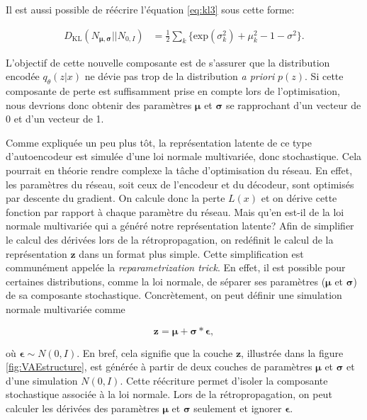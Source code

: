 Il est aussi possible de réécrire l'équation \ref{eq:kl3} sous cette forme:

\begin{equation}  \label{eq:kl4}
\begin{aligned}
D_{\text{KL}}(N_{\boldsymbol \mu, \boldsymbol \sigma} || N_{0,I}) &= \frac{1}{2} \sum_{k}\Big\{\text{exp}(\sigma_{k}^2) + \mu_{k}^2 - 1 - \sigma^2\Big\}.
\end{aligned}
\end{equation}


 L'objectif de cette nouvelle composante est de s'assurer que la distribution encodée $q_{\theta}(z|x)$ ne dévie pas trop de la distribution \textit{a priori} $p(z)$. Si cette composante de perte est suffisamment prise en compte lors de l'optimisation, nous devrions donc obtenir des paramètres $\boldsymbol{\mu}$ et $\boldsymbol{\sigma}$ se rapprochant d'un vecteur de 0 et d'un vecteur de 1.

Comme expliquée un peu plus tôt, la représentation latente de ce type d'autoencodeur est simulée d'une loi normale multivariée, donc stochastique. Cela pourrait en théorie rendre complexe la tâche d'optimisation du réseau. En effet, les paramètres du réseau, soit ceux de l'encodeur et du décodeur, sont optimisés par descente du gradient. On calcule donc la perte $L(x)$ et on dérive cette fonction par rapport à chaque paramètre du réseau. Mais qu'en est-il de la loi normale multivariée qui a généré notre représentation latente? Afin de simplifier le calcul des dérivées lors de la rétropropagation, on redéfinit le calcul de la représentation $\boldsymbol{z}$ dans un format plus simple. Cette simplification est communément appelée la  \textit{reparametrization trick}. En effet, il est possible pour certaines distributions, comme la loi normale, de séparer ses paramètres ($\boldsymbol{\mu}$ et $\boldsymbol{\sigma}$)  de sa composante stochastique. Concrètement, on peut définir une simulation normale multivariée comme

\begin{equation} \label{eq:latent_formula}
\boldsymbol{z} = \boldsymbol{\mu} + \boldsymbol{\sigma} *\boldsymbol{\epsilon},
\end{equation}

où $\boldsymbol{\epsilon} \sim N(0,I)$. En bref, cela signifie que la couche $\boldsymbol{z}$, illustrée dans la figure \ref{fig:VAEstructure}, est générée à partir de deux couches de paramètres $\boldsymbol{\mu}$ et $\boldsymbol{\sigma}$ et d'une simulation $N(0,I)$. Cette réécriture permet d'isoler la composante stochastique associée à la loi normale. Lors de la rétropropagation, on peut calculer les dérivées des paramètres $\boldsymbol{\mu}$ et $\boldsymbol{\sigma}$ seulement et ignorer $\boldsymbol{\epsilon}$. 


